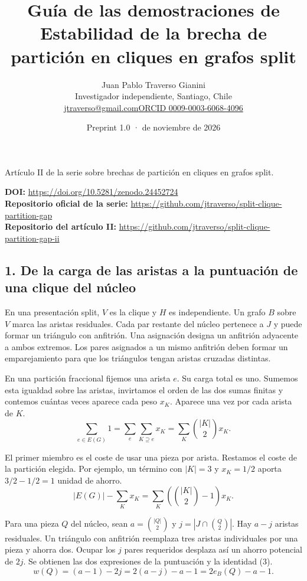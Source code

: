 \documentclass[spanish,11pt,a4paper]{article}
\title{Guía de las demostraciones de Estabilidad de la brecha de partición en cliques en grafos split}
\author{Juan Pablo Traverso Gianini\\\small Investigador independiente, Santiago, Chile\\\small\href{mailto:jtraverso@gmail.com}{jtraverso@gmail.com}\quad\href{https://orcid.org/0009-0003-6068-4096}{ORCID 0009-0003-6068-4096}}
\date{Preprint 1.0 \enspace · \enspace 23 de noviembre de 2026}
\begin{document}
\raggedbottom\maketitle
\begin{center}\small Artículo II de la serie sobre brechas de partición en cliques en grafos split.\end{center}
\noindent\textbf{DOI:} \url{https://doi.org/10.5281/zenodo.24452724}\\
\textbf{Repositorio oficial de la serie:} \url{https://github.com/jtraverso/split-clique-partition-gap}\\
\textbf{Repositorio del artículo II:} \url{https://github.com/jtraverso/split-clique-partition-gap-ii}
\subsection{1. De la carga de las aristas a la puntuación de una clique del núcleo}\label{de-la-carga-de-las-aristas-a-la-puntuaciuxf3n-de-una-clique-del-nuxfacleo}

En una presentación split, \(V\) es la clique y \(H\) es independiente. Un grafo \(B\) sobre \(V\) marca las aristas residuales. Cada par restante del núcleo pertenece a \(J\) y puede formar un triángulo con anfitrión. Una asignación designa un anfitrión adyacente a ambos extremos. Los pares asignados a un mismo anfitrión deben formar un emparejamiento para que los triángulos tengan aristas cruzadas distintas.

En una partición fraccional fijemos una arista \(e\). Su carga total es uno. Sumemos esta igualdad sobre las aristas, invirtamos el orden de las dos sumas finitas y contemos cuántas veces aparece cada peso \(x_K\). Aparece una vez por cada arista de \(K\).
\[
\sum_{e\in E(G)}1=\sum_e\sum_{K\supseteq e}x_K=\sum_K\binom{|K|}{2}x_K.
\]

El primer miembro es el coste de usar una pieza por arista. Restamos el coste de la partición elegida. Por ejemplo, un término con \(|K|=3\) y \(x_K=1/2\) aporta \(3/2-1/2=1\) unidad de ahorro.
\[
|E(G)|-\sum_Kx_K=\sum_K\left(\binom{|K|}{2}-1\right)x_K.
\]

Para una pieza \(Q\) del núcleo, sean \(a=\binom{|Q|}{2}\) y \(j=|J\cap\binom Q2|\). Hay \(a-j\) aristas residuales. Un triángulo con anfitrión reemplaza tres aristas individuales por una pieza y ahorra dos. Ocupar los \(j\) pares requeridos desplaza así un ahorro potencial de \(2j\). Se obtienen las dos expresiones de la puntuación y la identidad (3).
\[
w(Q)=(a-1)-2j=2(a-j)-a-1=2e_B(Q)-a-1.
\]
\end{document}
